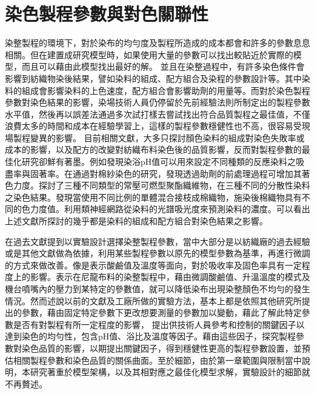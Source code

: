 \section{染色製程參數與對色關聯性}
\label{c:ch2.1}
染整製程的環境下，對於染布的均勻度及製程所造成的成本都會和許多的參數息息相關。但在建置成研究模型時，如果使用大量的參數可以找出較貼近於實際的模型，而且可以藉由此模型找出最好的解。
並且在染整過程中，有許多染色條件會影響到紡織物染後結果，譬如染料的組成、配方組合及染程的參數設計等。其中染料的組成會影響染料的上色速度，配方組合會影響助劑的用量等。而對於染色製程參數對染色結果的影響，染場技術人員仍停留於先前經驗法則所制定出的製程參數水平值，然後再以誤差法通過多次試打樣去嘗試找出符合品質製程之最佳值，不僅浪費太多的時間和成本在經驗學習上，這樣的製程參數穩健性也不高，很容易受現場製程變異的影響。
目前相關文獻，大多只探討顏色染料的組成對染色失敗率或成本的影響，以及配方的改變對紡織布料染色後的品質影響，反而對製程參數的最佳化研究卻鮮有著墨。例如\cite{Harada.etc}發現染浴pH值可以用來設定不同種類的反應染料之吸盡率與固著率。\cite{Guo.etc}在通過對棉紗染色的研究，發現透過助劑的前處理過程可增加其著色力度。\cite{Chen}探討了三種不同類型的常壓可燃型聚酯織維物，在三種不同的分散性染料之染色結果。\cite{Huang.etc}發現當使用不同比例的單體混合接枝成棉織物，施染後棉織物具有不同的色力度值。利用類神經網路從染料的光譜吸光度來預測染料的濃度。可以看出上述文獻所探討的幾乎都是染料的組成和配方組合對染色結果之影響。

在過去文獻提到以實驗設計選擇染整製程參數，當中大部分是以紡織廠的過去經驗或是其他文獻做為依據，利用某些製程參數以原先的模型參數為基準，再進行微調的方式來做改善。像是\cite{Harada.etc}表示酸鹼值及溫度等面向，對於吸收率及固色率具有一定程度上的影響。\cite{jy2007dyeing}表示在尼龍布料的染整製程中，藉由微調酸鹼值、升溫溫度的模式及機台噴嘴內的壓力到某特定的參數值，就可以降低染布出現染整顏色不均勻的發生情況。然而\cite{Etemadifar.etc}述說以前的文獻及工廠所做的實驗方法，基本上都是依照其他研究所提出的參數，藉由固定特定參數下更改想要測量的參數加以變動，藉此了解此特定參數是否有對製程有所一定程度的影響，
\cite{Wang.etc}提出供技術人員參考和控制的關鍵因子以達到染色的均勻性，包含pH值、浴比及溫度等因子。藉由這些因子，探究製程參數對染色品質的影響，以期提出關鍵因子，得到穩健性更高的製程參數設置，並預估相關製程參數和染色品質的關係曲面。至於細節，由於第一章範圍與限制當中說明，本研究著重於模型架構，以及其相對應之最佳化模型求解，實驗設計的細節就不再贅述。